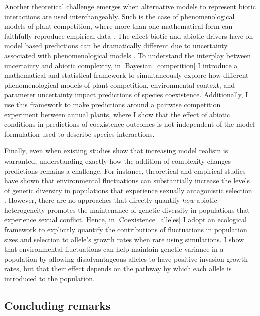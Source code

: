 \begin{refsection}
Another theoretical challenge emerges when alternative models to represent biotic interactions are used interchangeably. Such is the case of phenomenological models of plant competition, where more than one mathematical form can faithfully reproduce empirical data \citep{levine2009importance,godoy_phenology_2014,godoy_phylogenetic_2014,mayfield2017higher,bimler_accurate_2018}. The effect biotic and abiotic drivers have on model based predictions can be dramatically different due to uncertainty associated with phenomenological models \citep{jorgensen2001fundamentals,flora_structural_2011, aldebert2018community}. To understand the interplay between uncertainty and abiotic complexity, in \autoref{Bayesian_competition} I introduce a mathematical and statistical framework to simultaneously explore how different phenomenological models of plant competition, environmental context, and parameter uncertainty impact predictions of species coexistence. Additionally, I use this framework to make predictions around a pairwise competition experiment between annual plants, where I show that the effect of abiotic conditions in predictions of coexistence outcomes is not independent of the model formulation used to describe species interactions.

Finally, even when existing studies show that increasing model realism is warranted, understanding exactly how the addition of complexity changes predictions remains a challenge. For instance, theoretical and empirical studies have shown that environmental fluctuations can substantially increase the levels of genetic diversity in populations that experience sexually antagonistic selection \citep{connallon2012general,connallon_evolutionary_2019, glaser2021sexual}. However, there are no approaches that directly quantify \textit{how} abiotic heterogeneity promotes the maintenance of genetic diversity in populations that experience sexual conflict. Hence, in \autoref{Coexistence_alleles} I adopt an ecological framework to explicitly quantify the contributions of fluctuations in population sizes and selection to allele's growth rates when rare using simulations. I show that environmental fluctuations can help maintain genetic variance in a population by allowing disadvantageous alleles to have positive invasion growth rates,  but that their effect depends on the pathway by which each allele is introduced to the population.


\subsection*{Concluding remarks}


\end{refsection}
